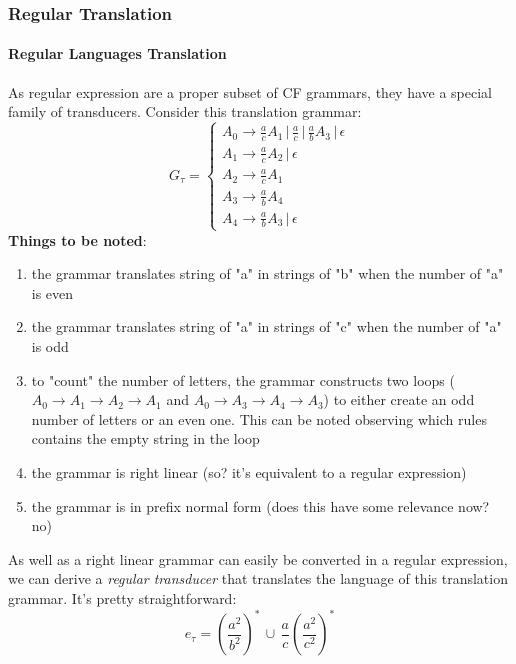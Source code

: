 \documentclass[10pt,a4paper]{article}
\begin{document}
				\subsubsection{Regular Translation}
					\paragraph{Regular Languages Translation}
						As regular expression are a proper subset of CF grammars, they have a special family of transducers. Consider this translation grammar:
						\begin{equation}
							G_\tau = 
							\begin{cases}
								A_0 \rightarrow \frac{a}{c}A_1 \,\vert\, \frac{a}{c} \,\vert\, \frac{a}{b}A_3 \,\vert\, \epsilon \\
								A_1 \rightarrow \frac{a}{c}A_2 \,\vert\, \epsilon \\
								A_2 \rightarrow \frac{a}{c}A_1 \\
								A_3 \rightarrow \frac{a}{b}A_4 \\
								A_4 \rightarrow \frac{a}{b}A_3 \,\vert\, \epsilon 
							\end{cases}
						\end{equation}
						\textbf{Things to be noted}:
						\begin{enumerate}
							\item the grammar translates string of "a" in strings of "b" when the number of "a" is even
							\item the grammar translates string of "a" in strings of "c" when the number of "a" is odd
							\item to "count" the number of letters, the grammar constructs two loops ($A_0 \rightarrow A_1 \rightarrow A_2 \rightarrow A_1$ and $A_0 \rightarrow A_3 \rightarrow A_4 \rightarrow A_3$) to either create an odd number of letters or an even one. This can be noted observing which rules contains the empty string in the loop
							\item the grammar is right linear (so? it's equivalent to a regular expression)
							\item the grammar is in prefix normal form (does this have some relevance now? no)
						\end{enumerate}
						As well as a right linear grammar can easily be converted in a regular expression, we can derive a \emph{regular transducer} that translates the language of this translation grammar. It's pretty straightforward:
						\begin{equation}
							e_\tau = \left(\frac{a^2}{b^2} \right)^\ast \,\cup\, \frac{a}{c} \left(\frac{a^2}{c^2} \right)^\ast
						\end{equation}
						
\end{document}

